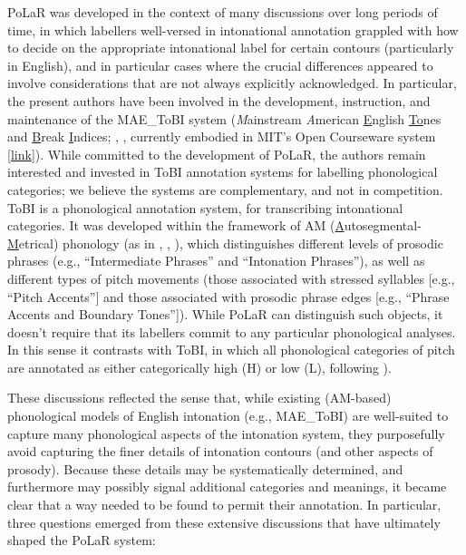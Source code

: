 PoLaR was developed in the context of many discussions over long periods of time, in which labellers well-versed in intonational annotation grappled with how to decide on the appropriate intonational label for certain contours (particularly in English), and in particular cases where the crucial differences appeared to involve considerations that are not always explicitly acknowledged. 
%
{In particular, the present authors have been involved in the development, instruction, and maintenance of the MAE\_ToBI system (\textit{M}ainstream \textit{A}merican \uline{E}nglish \uline{To}nes and \uline{B}reak \uline{I}ndices; \citealt{beckmanhirschberg94}, \citealt{beckmanayers97}, \citealt{beckman-05} currently embodied in MIT’s Open Courseware system [\href{https://ocw.mit.edu/courses/electrical-engineering-and-computer-science/6-911-transcribing-prosodic-structure-of-spoken-utterances-with-tobi-january-iap-2006/}{link}]). While committed to the development of PoLaR, the authors remain interested and invested in ToBI annotation systems for labelling phonological categories; we believe the systems are complementary, and not in competition. ToBI is a phonological annotation system, for transcribing intonational categories. It was developed within the framework of AM (\uline{A}utosegmental-\uline{M}etrical) phonology (as in \citealt{pierrehumbert80}, \citealt{ladd08}, \citealt{arvanitifletcher20}), which distinguishes different levels of prosodic phrases (e.g., “Intermediate Phrases” and “Intonation Phrases”), as well as different types of pitch movements (those associated with stressed syllables [e.g., “Pitch Accents”] and those associated with prosodic phrase edges [e.g., “Phrase Accents and Boundary Tones”]). While PoLaR can distinguish such objects, it doesn’t require that its labellers commit to any particular phonological analyses. In this sense it contrasts with ToBI, in which all phonological categories of pitch are annotated as either categorically high (H) or low (L), following \citealt{pierrehumbert80}).}

These discussions reflected the sense that, while existing (AM-based) phonological models of English intonation (e.g., MAE\_ToBI) are well-suited to capture many phonological aspects of the intonation system, they purposefully avoid capturing the finer details of intonation contours (and other aspects of prosody).  Because these details may be systematically determined, and furthermore may possibly signal additional categories and meanings, it became clear that a way needed to be found to permit their annotation. In particular, three questions emerged from these extensive discussions that have ultimately shaped the PoLaR system:

